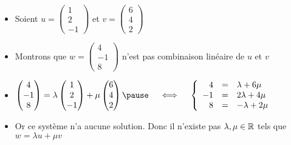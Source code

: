 \begin{frame}
\begin{exemple}
\begin{itemize}
  \item Soient $u = \left(\begin{smallmatrix}1\\ 2\\ -1\end{smallmatrix}\right)$ et $v =
  \left(\begin{smallmatrix}6\\4\\2\end{smallmatrix}\right)$

   \pause
   
  \item Montrons que $ w = \left(\begin{smallmatrix}4\\ -1\\ 8\end{smallmatrix}\right)$
  n'est pas combinaison linéaire de $u$ et $v$

   \pause
   
  \item $\begin{pmatrix}4\\-1\\8\end{pmatrix} 
  = \lambda\begin{pmatrix}1\\2\\-1\end{pmatrix} + \mu\begin{pmatrix}6\\4\\2\end{pmatrix}
   \pause  \quad \iff \quad 
\left\{\begin{array}{rcl}
4 & = &\lambda + 6 \mu\\ -1 & = &2\lambda + 4\mu\\ 8 & = & -\lambda + 2\mu
\end{array}\right.$
 
   \pause
   
  \item Or ce système n'a aucune solution.
  Donc il n'existe pas $\lambda,\mu \in \mathbb{R}$ tels que $w=\lambda u + \mu v$
\end{itemize}

\end{exemple}
\end{frame}


